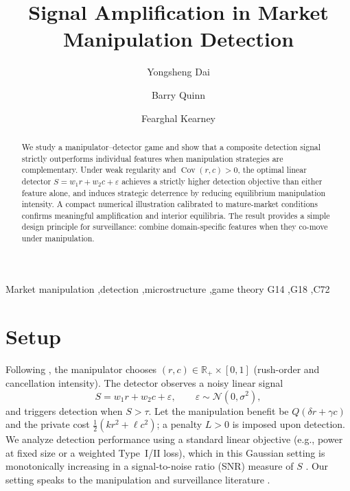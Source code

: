 \documentclass[preprint,12pt,authoryear]{elsarticle}
\begin{document}
\begin{frontmatter}

\title{Signal Amplification in Market Manipulation Detection}

\author[qub]{Yongsheng Dai}
\author[uu]{Barry Quinn}
\author[qbs]{Fearghal Kearney}

\address[qub]{School of EEECS, Queen's University Belfast}
\address[uu]{Ulster University Business School, Ulster University}
\address[qbs]{Queen's Business School, Queen's University Belfast}

\begin{abstract}
We study a manipulator--detector game and show that a composite detection signal strictly outperforms individual features when manipulation strategies are complementary. Under weak regularity and $\operatorname{Cov}(r,c)>0$, the optimal linear detector $S=w_1 r + w_2 c + \varepsilon$ achieves a strictly higher detection objective than either feature alone, and induces strategic deterrence by reducing equilibrium manipulation intensity. A compact numerical illustration calibrated to mature-market conditions confirms meaningful amplification and interior equilibria. The result provides a simple design principle for surveillance: combine domain-specific features when they co-move under manipulation.
\end{abstract}

\begin{keyword}
Market manipulation \sep detection \sep microstructure \sep game theory
\JEL G14 \sep G18 \sep C72
\end{keyword}

\end{frontmatter}


\section{Setup}
Following \citet{vila1989simple}, the manipulator chooses $(r,c)\in\mathbb{R}_+\times[0,1]$ (rush-order and cancellation intensity). The detector observes a noisy linear signal
\begin{equation}
S=w_1 r + w_2 c + \varepsilon,\qquad \varepsilon\sim \mathcal{N}(0,\sigma^2),\label{eq:signal}
\end{equation}
and triggers detection when $S>\tau$. Let the manipulation benefit be $Q(\delta r + \gamma c)$ and the private cost $\tfrac{1}{2}(k r^2 + \ell c^2)$; a penalty $L>0$ is imposed upon detection. We analyze detection performance using a standard linear objective (e.g., power at fixed size or a weighted Type~I/II loss), which in this Gaussian setting is monotonically increasing in a signal-to-noise ratio (SNR) measure of $S$ \citep{kay1998fundamentals}. Our setting speaks to the manipulation and surveillance literature \citep{aggarwal2006stock,putnins2012market}.
\end{document}
